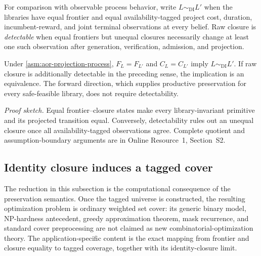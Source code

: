 For comparison with observable process behavior, write \(L\sim_{\mathrm{DI}}L'\)
when the libraries have equal frontier and equal availability-tagged project
cost, duration, incumbent-reward, and joint terminal observations at every
belief.  Raw closure is \emph{detectable} when equal frontiers but unequal
closures necessarily change at least one such observation after generation,
verification, admission, and projection.

\begin{theorem}
\label{thm:raw-frontier-closure-characterization}
\label{thm:unified-safe-deletion}
Under \cref{asm:aor-projection-process},
\(F_L=F_{L'}\) and \(C_L=C_{L'}\) imply
\(L\sim_{\mathrm{DI}}L'\).  If raw closure is additionally detectable in the
preceding sense, the implication is an equivalence.  The forward direction,
which supplies productive preservation for every safe-feasible library, does
not require detectability.
\end{theorem}

\noindent\emph{Proof sketch.}
Equal frontier--closure states make every library-invariant primitive and its
projected transition equal.  Conversely, detectability rules out an unequal
closure once all availability-tagged observations agree.  Complete quotient
and assumption-boundary arguments are in Online Resource~1, Section~S2.

\subsection{Identity closure induces a tagged cover}
\label{subsec:aor-tagged-cover}

The reduction in this subsection is the computational consequence of the
preservation semantics. Once the tagged universe is constructed, the resulting
optimization problem is ordinary weighted set cover: its generic binary model,
NP-hardness antecedent, greedy approximation theorem, mask recurrence, and
standard cover preprocessing are not claimed as new combinatorial-optimization
theory. The application-specific content is the exact mapping from frontier and
closure equality to tagged coverage, together with its identity-closure limit.

\begin{center}
\end{center}

